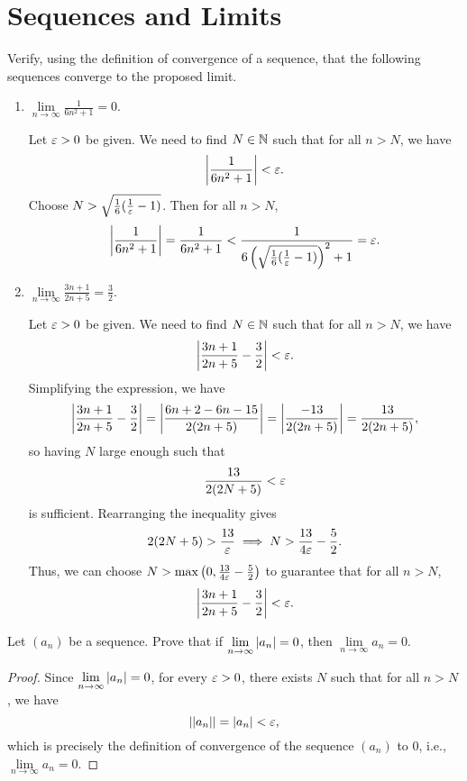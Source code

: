 \section{Sequences and Limits}

\begin{problem}
  Verify, using the definition of convergence of a sequence, that the following
  sequences converge to the proposed limit.

  \begin{enumerate}[label=(\alph*)]
    \item $\lim\limits_{n \to \infty} \frac{1}{6n^{2} + 1} = 0$.

      Let $\varepsilon > 0$ be given. We need to find $N \in \mathbb{N}$ such that for all $n > N$, we have 
      \[
        \left\lvert \frac{1}{6n^{2} + 1} \right\rvert < \varepsilon.
      \]
      Choose $N > \sqrt{\frac{1}{6}(\frac{1}{\varepsilon} - 1)}$. Then for all $n > N$,
      \[
        \left\lvert \frac{1}{6n^{2} + 1} \right\rvert = \frac{1}{6n^{2} + 1} < \frac{1}{6 \left( \sqrt{\frac{1}{6}(\frac{1}{\varepsilon} - 1)} \right)^{2} + 1} = \varepsilon.
      \]

    \item $\lim\limits_{n \to \infty} \frac{3n + 1}{2n + 5} = \frac{3}{2}$.

      Let $\varepsilon > 0$ be given. We need to find $N \in \mathbb{N}$ such that for all $n > N$, we have 
      \[
        \left\lvert \frac{3n + 1}{2n + 5} - \frac{3}{2} \right\rvert < \varepsilon.
      \]
      Simplifying the expression, we have
      \[
        \left\lvert \frac{3n + 1}{2n + 5} - \frac{3}{2} \right\rvert = \left\lvert \frac{6n + 2 - 6n - 15}{2(2n + 5)} \right\rvert = \left\lvert \frac{-13}{2(2n + 5)} \right\rvert = \frac{13}{2(2n + 5)},
      \]
      so having $N$ large enough such that
      \[
        \frac{13}{2(2N + 5)} < \varepsilon
      \]
      is sufficient. Rearranging the inequality gives 
      \[
        2(2N + 5) > \frac{13}{\varepsilon} \implies N > \frac{13}{4\varepsilon} - \frac{5}{2}.
      \]
      Thus, we can choose $N > \max\left(0, \frac{13}{4\varepsilon} - \frac{5}{2}\right)$ to 
      guarantee that for all $n > N$,
      \[
        \left\lvert \frac{3n + 1}{2n + 5} - \frac{3}{2} \right\rvert < \varepsilon.
      \]
  \end{enumerate}

\end{problem}

\begin{problem}
  Let $(a_{n})$ be a sequence. Prove that if $\lim\limits_{n \to \infty} \left\lvert a_{n} \right\rvert = 0$, 
  then $\lim\limits_{n \to \infty} a_{n} = 0$.

  \begin{proof}
    Since $\lim\limits_{n \to \infty} \left\lvert a_{n} \right\rvert = 0$, for every $\varepsilon > 0$, there exists $N$ 
    such that for all $n > N$, we have
    \[
      \left\lvert  \left\lvert  a_{n}  \right\rvert  \right\rvert = \left\lvert a_{n} \right\rvert < \varepsilon,
    \]
    which is precisely the definition of convergence of the sequence $(a_{n})$ to $0$, i.e., 
    $\lim\limits_{n \to \infty} a_{n} = 0$.
  \end{proof}

\end{problem}

